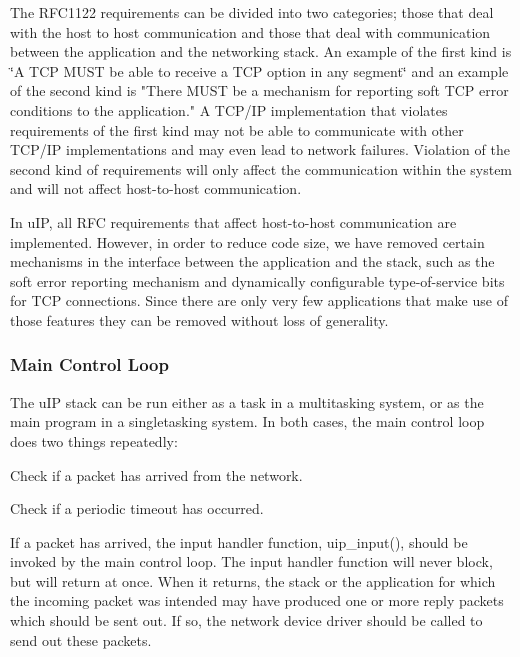 \-The \-R\-F\-C1122 requirements can be divided into two categories; those that deal with the host to host communication and those that deal with communication between the application and the networking stack. \-An example of the first kind is \char`\"{}\-A T\-C\-P M\-U\-S\-T be able to receive a T\-C\-P
option in any segment\char`\"{} and an example of the second kind is "\-There \-M\-U\-S\-T be a mechanism for reporting soft \-T\-C\-P error conditions to the application." \-A \-T\-C\-P/\-I\-P implementation that violates requirements of the first kind may not be able to communicate with other \-T\-C\-P/\-I\-P implementations and may even lead to network failures. \-Violation of the second kind of requirements will only affect the communication within the system and will not affect host-\/to-\/host communication.

\-In u\-I\-P, all \-R\-F\-C requirements that affect host-\/to-\/host communication are implemented. \-However, in order to reduce code size, we have removed certain mechanisms in the interface between the application and the stack, such as the soft error reporting mechanism and dynamically configurable type-\/of-\/service bits for \-T\-C\-P connections. \-Since there are only very few applications that make use of those features they can be removed without loss of generality.\hypertarget{a00060_mainloop}{}\subsubsection{\-Main Control Loop}\label{a00060_mainloop}
\-The u\-I\-P stack can be run either as a task in a multitasking system, or as the main program in a singletasking system. \-In both cases, the main control loop does two things repeatedly\-:


\begin{DoxyItemize}
\item \-Check if a packet has arrived from the network.
\item \-Check if a periodic timeout has occurred.
\end{DoxyItemize}

\-If a packet has arrived, the input handler function, uip\-\_\-input(), should be invoked by the main control loop. \-The input handler function will never block, but will return at once. \-When it returns, the stack or the application for which the incoming packet was intended may have produced one or more reply packets which should be sent out. \-If so, the network device driver should be called to send out these packets.


